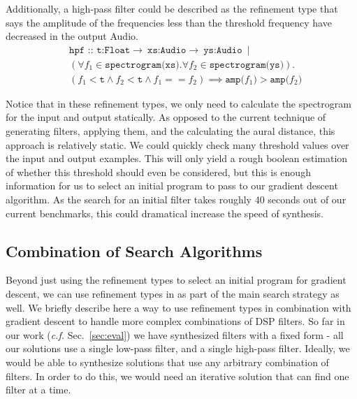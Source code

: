 Additionally, a high-pass filter could be described as the refinement type that says the amplitude of the frequencies less than the threshold frequency have decreased in the output Audio.
%
\begin{align*}
  &\texttt{hpf :: t:Float} \to\ \texttt{xs:Audio} \to\ \texttt{ys:Audio}\ \mid \\
  &(\forall f_1 \in \texttt{spectrogram(xs)}. \forall f_2 \in \texttt{spectrogram(ys)}). \\
  &(f_1 < \texttt{t} \land f_2 < \texttt{t} \land f_1 == f_2) \implies \texttt{amp(}f_1\texttt{)} > \texttt{amp(} f_2 \texttt{)} 
\end{align*}

Notice that in these refinement types, we only need to calculate the spectrogram for the input and output statically.
As opposed to the current technique of generating filters, applying them, and the calculating the aural distance, this approach is relatively static.
We could quickly check many threshold values over the input and output examples.
This will only yield a rough boolean estimation of whether this threshold should even be considered, but this is enough information for us to select an initial program to pass to our gradient descent algorithm.
As the search for an initial filter takes roughly 40 seconds out of our current benchmarks, this could dramatical increase the speed of synthesis.

\subsection{Combination of Search Algorithms}

Beyond just using the refinement types to select an initial program for gradient descent, we can use refinement types in as part of the main search strategy as well.
We briefly describe here a way to use refinement types in combination with gradient descent to handle more complex combinations of DSP filters.
So far in our work (\textit{c.f.} Sec.~\ref{sec:eval}) we have synthesized filters with a fixed form - all our solutions use a single low-pass filter, and a single high-pass filter.
Ideally, we would be able to synthesize solutions that use any arbitrary combination of filters.
In order to do this, we would need an iterative solution that can find one filter at a time.

